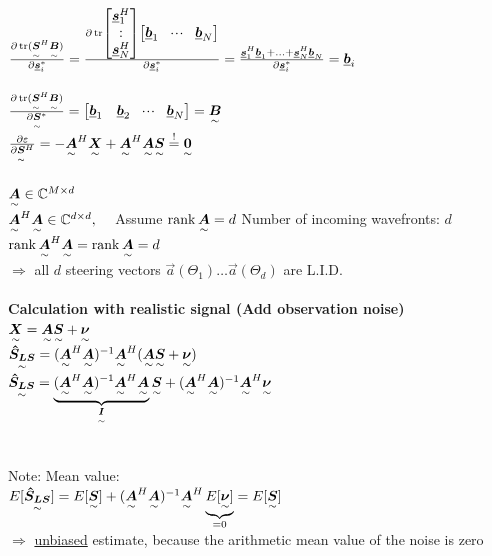 \begin{doublespace}
$\frac{\partial\trace(\ma{S}^H\ma{B})}{\partial\vec{s}_i^*}=\frac{\partial\trace \mat{\vec{s}_1^H\\\svdots\\\vec{s}_N^H}\mat{\vec{b}_1&\shdots&\vec{b}_N}}{\partial\vec{s}_i^*}=\frac{\vec{s}_1^H\vec{b}_1+\ldots+\vec{s}_N^H\vec{b}_N}{\partial\vec{s}_i^*}=\vec{b}_i$\\ \\
$\frac{\partial\trace(\ma{S}^H\ma{B})}{\partial\ma{S}^*}=\mat{\vec{b}_1&\vec{b}_2&\shdots&\vec{b}_N}=\ma{B}$\\ 
$\frac{\partial\varepsilon}{\partial\ma{S}^H}=-\ma{A}^H\ma{X}+\ma{A}^H\ma{A}\ma{S}\stackrel{!}{=}\ma{0}$\\
\\
$\ma{A}\in\mathbb{C}^{M\times d}$\\
$\ma{A}^H\ma{A}\in\mathbb{C}^{d\times d},\quad$ Assume $\rank \ma{A}=d$ \qquad \pfeil Number of incoming wavefronts: $d$\\
$\rank\ma{A}^H\ma{A}=\rank\ma{A}=d$\\
$\Rightarrow$ all $d$ steering vectors $\vec{a}(\Theta_1)\ldots\vec{a}(\Theta_d)$ are L.I.D.\\ \ \\
\textbf{Calculation with realistic signal (Add observation noise) }\\
$\ma{X}=\ma{A}\ma{S}+\ma{\nu}$\\
$\ma{\hat{S}_{LS}}=(\ma{A}^H\ma{A})^{-1}\ma{A}^H(\ma{A}\ma{S}+\ma{\nu})$\\
$\ma{\hat{S}_{LS}}=\underbrace{(\ma{A}^H\ma{A})^{-1}\ma{A}^H\ma{A}}_{\ma{I}}\ma{S}+(\ma{A}^H\ma{A})^{-1}\ma{A}^H\ma{\nu}$\\
\\ \ \\
Note: Mean value:\\
$E[\ma{\hat{S}_{LS}}]=E[\ma{S}]+(\ma{A}^H\ma{A})^{-1}\ma{A}^H\underbrace{E[\ma{\nu}]}_{=0}=E[\ma{S}]$\\
$\Rightarrow$ \underline{unbiased} estimate, because the arithmetic mean value of the noise is zero


\end{doublespace}
